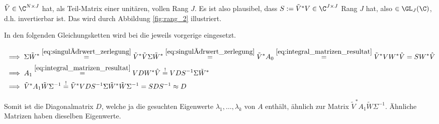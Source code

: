 $\tilde V \in \C^{N \times J}$ hat, als Teil-Matrix einer unitären, vollen Rang $J$.
Es ist also plausibel, dass $S := \tilde V^\ast V \in \C^{J \times J}$ Rang $J$ hat, also $\in \GL_J(\C)$, d.h. invertierbar ist.
Das wird durch Abbildung \ref{fig:rang_2} illustriert.



In den folgenden Gleichungsketten wird bei \Quote{!} die jeweils vorgerige eingesetzt.

\begin{align*}
    & \implies
    \Sigma \tilde W^\ast
    \stackrel
    {
        \eqref{eq:singulärwert_zerlegung}
    }{=}
    \tilde V^\ast \tilde V \Sigma \tilde W^\ast
    \stackrel
    {
        \eqref{eq:singulärwert_zerlegung}
    }{=}
    \tilde V^\ast A_0
    \stackrel
    {
        \eqref{eq:integral_matrizen_resultat}
    }{=}
    \tilde V^\ast V W^\ast \hat V
    =
    S W^\ast \hat V \\
    & \implies
    A_1
    \stackrel
    {
        \eqref{eq:integral_matrizen_resultat}
    }{=}
    V D W^\ast \hat V
    \stackrel{!}{=}
    V D S^{-1} \Sigma \tilde W^\ast \\
    & \implies
    \tilde V^\ast A_1 \tilde W \Sigma^{-1}
    \stackrel{!}{=}
    \tilde V^\ast V D S^{-1} \Sigma \tilde W^\ast \tilde W \Sigma^{-1}
    =
    S D S^{-1}
    \approx
    D
\end{align*}

Somit ist die Diagonalmatrix $D$, welche ja die gesuchten Eigenwerte $\lambda_1, \dots, \lambda_k$ von $A$ enthält, ähnlich zur Matrix $\tilde V^\ast A_1 \tilde W \Sigma^{-1}$.
Ähnliche Matrizen haben dieselben Eigenwerte.
